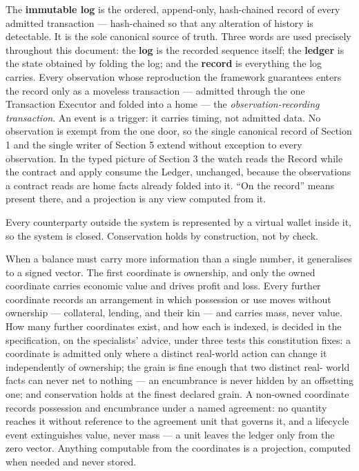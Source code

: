 \documentclass[11pt,a4paper]{article}
\newcommand{\clabel}[1]{\leavevmode\hypertarget{clause-#1}{}%
  \marginpar{\raggedright\scriptsize\ttfamily\textcolor{gray}{#1}}}
\begin{document}
\clabel{C-4.8}The \textbf{immutable log} is the ordered, append-only, hash-chained
record of every admitted transaction --- hash-chained so that any
alteration of history is detectable. It is the sole canonical source of truth. Three words are used precisely
throughout this document: the \textbf{log} is the recorded sequence itself;
the \textbf{ledger} is the state obtained by folding the log; and the
\textbf{record} is everything the log carries. Every observation whose
reproduction the framework guarantees enters the record only as a moveless
transaction --- admitted through the one Transaction Executor and folded
into a home --- the \emph{observation-recording transaction}. An event is a
trigger: it carries timing, not admitted data. No observation is exempt from
the one door, so the single canonical record of Section 1 and the single
writer of Section 5 extend without exception to every observation. In the
typed picture of Section 3 the watch reads the Record while the contract and
apply consume the Ledger, unchanged, because the observations a contract
reads are home facts already folded into it. ``On the record'' means present
there, and a projection is any view computed from it.

\clabel{C-4.9}Every counterparty outside the system is represented by a virtual wallet
inside it, so the system is closed. Conservation holds by construction,
not by check.

\clabel{C-4.10}When a balance must carry more information than a single
number, it generalises to a signed vector. The first coordinate is
ownership, and only the owned coordinate carries economic value and drives
profit and loss. Every further coordinate records an arrangement in which
possession or use moves without ownership --- collateral, lending, and their
kin --- and carries mass, never value. How many further coordinates exist,
and how each is indexed, is decided in the specification, on the
specialists' advice, under three tests this constitution fixes: a coordinate
is admitted only where a distinct real-world action can change it
independently of ownership; the grain is fine enough that two distinct real-
world facts can never net to nothing --- an encumbrance is never hidden by
an offsetting one; and conservation holds at the finest declared grain.
\clabel{C-4.11}A non-owned coordinate records possession and encumbrance
under a named agreement: no quantity reaches it without reference to the
agreement unit that governs it, and a lifecycle event extinguishes value,
never mass --- a unit leaves the ledger only from the zero vector. Anything computable from the coordinates is a projection, computed when needed and never stored.
\end{document}
